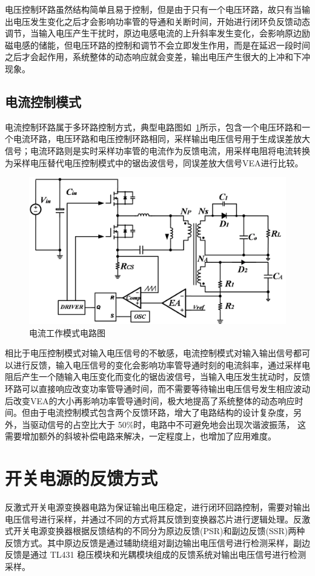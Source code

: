 电压控制环路虽然结构简单且易于控制，但是由于只有一个电压环路，故只有当输出电压发生变化之后才会影响功率管的导通和关断时间，开始进行闭环负反馈动态调节，当输入电压产生干扰时，原边电感电流的上升斜率发生变化，会影响原边励磁电感的储能，但电压环路的控制和调节不会立即发生作用，而是在延迟一段时间之后才会起作用，系统整体的动态响应就会变差，输出电压产生很大的上冲和下冲现象。

\subsection{电流控制模式}
\label{sec:电流控制模式}
电流控制环路属于多环路控制方式，典型电路图如~\ref{fig:电流工作模式电路图}所示，包含一个电压环路和一个电流环路，电压环路和电压控制环路相同，采样输出电压信号用于生成误差放大信号；电流环路则是实时采样功率管的电流作为反馈电流，用采样电阻将电流转换为采样电压替代电压控制模式中的锯齿波信号，同误差放大信号VEA进行比较。

\begin{figure}[htbp] 
    \centering
    \includegraphics[width=0.8\linewidth]{figures/电流工作模式电路图.png}
    \caption{电流工作模式电路图}
    \label{fig:电流工作模式电路图}
\end{figure}

相比于电压控制模式对输入电压信号的不敏感，电流控制模式对输入输出信号都可以进行反馈，输入电压信号的变化会影响功率管导通时刻的电流斜率，通过采样电阻后产生一个随输入电压变化而变化的锯齿波信号，当输入电压发生扰动时，反馈环路可以直接响应改变功率管导通时间，而不需要等待输出电压信号发生相应波动后改变VEA的大小再影响功率管导通时间，极大地提高了系统整体的动态响应时间。但由于电流控制模式包含两个反馈环路，增大了电路结构的设计复杂度，另外，当驱动信号的占空比大于 50\%时，电路中不可避免地会出现次谐波振荡， 这需要增加额外的斜坡补偿电路来解决，一定程度上，也增加了应用难度。

 
\section{开关电源的反馈方式}
反激式开关电源变换器电路为保证输出电压稳定，进行闭环回路控制，需要对输出电压信号进行采样，并通过不同的方式将其反馈到变换器芯片进行逻辑处理。反激式开关电源变换器根据反馈结构的不同分为原边反馈(PSR)和副边反馈(SSR)两种反馈方式。其中原边反馈是通过辅助绕组对副边输出电压信号进行检测采样，副边反馈是通过 TL431 稳压模块和光耦模块组成的反馈系统对输出电压信号进行检测采样。

